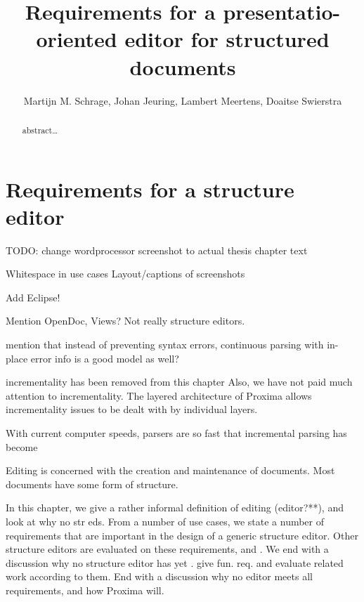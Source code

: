 \documentclass{speauth}
\begin{document}
  \title{Requirements for a presentatio-oriented editor for structured documents} 
  \author{Martijn M. Schrage, Johan Jeuring, Lambert Meertens, Doaitse Swierstra}
  \address{Institute of Information and Computing Sciences\\ Utrecht University\\
    Utrecht, The Netherlands}     
\begin{abstract} 
  abstract\dots
\end{abstract}


\section{Requirements for a structure editor} \label{chap:requirements}



\bc

TODO: change wordprocessor screenshot to actual thesis chapter text

Whitespace in use cases
Layout/captions of screenshots

Add Eclipse!





Mention OpenDoc, Views? Not really structure editors.

mention that instead of preventing syntax errors, continuous parsing with in-place error 
info is a good model as well?

incrementality  has been removed from this chapter
Also, we have not paid much attention to incrementality. The layered architecture of Proxima allows incrementality issues to be dealt with by individual layers. 

With current computer speeds, parsers are so fast that incremental parsing has become %
\ec

\bc
Editing is concerned with the creation and maintenance of documents.  
Most documents have some form of structure. 

In this chapter, we give a rather informal definition of editing (editor?**), and look at why no str eds. From a number of use cases, we state a number of requirements that are important in the design of a generic structure editor. Other structure editors are evaluated on these requirements, and . We end with a discussion why no structure editor has yet .  give fun. req. and evaluate related work according to them. End with a discussion why no editor meets all requirements, and how Proxima will.
\ec
\end{document}
